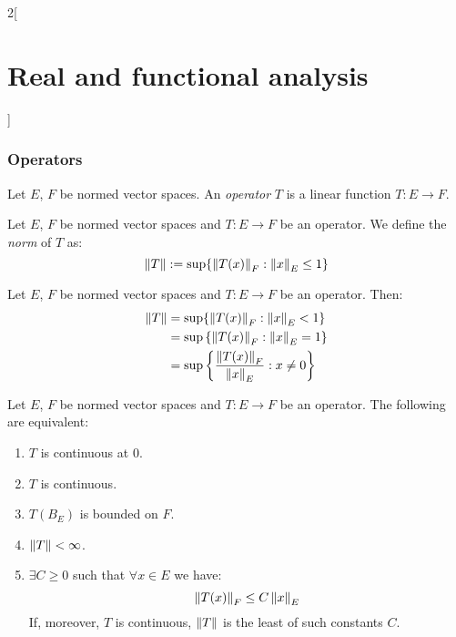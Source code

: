 \documentclass[../../../main_math.tex]{subfiles}
\begin{document}
\begin{multicols}{2}[\section{Real and functional analysis}]
  \subsubsection{Operators}
  \begin{definition}
    Let $E$, $F$ be normed vector spaces. An \emph{operator} $T$ is a linear function $T:E\rightarrow F$.
  \end{definition}
  \begin{definition}
    Let $E$, $F$ be normed vector spaces and $T:E\rightarrow F$ be an operator. We define the \emph{norm} of $T$ as:
    \begin{equation}\label{RFA_normoperator}
      \left\|T\right\|:=\sup\{\left\|T(x)\right\|_F:\left\|x\right\|_E\leq 1\}
    \end{equation}
  \end{definition}
  \begin{lemma}
    Let $E$, $F$ be normed vector spaces and $T:E\rightarrow F$ be an operator. Then:
    \begin{align*}
      \left\|T\right\| & =\sup\{\left\|T(x)\right\|_F:\left\|x\right\|_E< 1\}                        \\
               & =\sup\left\{\left\|T(x)\right\|_F:\left\|x\right\|_E= 1\right\}             \\
               & =\sup\left\{\frac{\left\|T(x)\right\|_F}{\left\|x\right\|_E}:x\ne 0\right\}
    \end{align*}
  \end{lemma}
  \begin{theorem}
    Let $E$, $F$ be normed vector spaces and $T:E\rightarrow F$ be an operator. The following are equivalent:
    \begin{enumerate}
      \item $T$ is continuous at 0.
      \item $T$ is continuous.
      \item $T(B_E)$ is bounded on $F$.
      \item $\left\|T\right\|<\infty$.
      \item $\exists C\geq 0$ such that $\forall x\in E$ we have: $$\left\|T(x)\right\|_F\leq C\left\|x\right\|_E$$
            If, moreover, $T$ is continuous, $\left\|T\right\|$ is the least of such constants $C$.
    \end{enumerate}
  \end{theorem}

\end{multicols}
\end{document}
